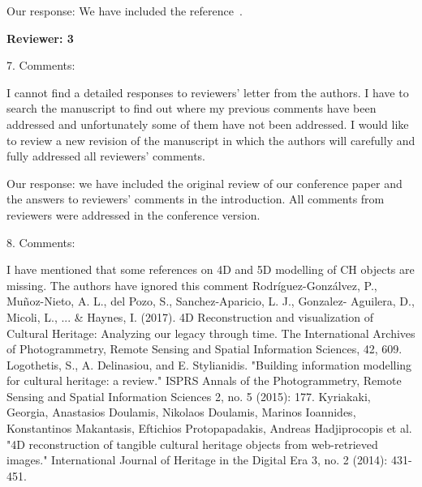 \documentclass[acmlarge,screen,dvipsnames]{acmart}
\begin{document}
Our response: We have included the reference~\cite{cgal:eb-14a}.

\greenEnd

\textbf{Reviewer: 3}


7. Comments:


I cannot find a detailed responses to reviewers' letter from the authors. I have to search the manuscript to find out where my previous comments have been addressed and unfortunately some of them have not been addressed. I would like to review a new revision of the manuscript in which the authors will carefully and fully addressed all reviewers' comments. 

\greenBegin

Our response: we have included the original review of our conference paper and the answers to reviewers’ comments  in the introduction. All comments from reviewers were addressed in the conference version.

\greenEnd


8. Comments:

I have mentioned that some references on 4D and 5D modelling of CH objects are missing. The authors have ignored this comment
Rodríguez-Gonzálvez, P., Muñoz-Nieto, A. L., del Pozo, S., Sanchez-Aparicio, L. J., Gonzalez- Aguilera, D., Micoli, L., ... \& Haynes, I. (2017). 4D Reconstruction and visualization of Cultural Heritage: Analyzing our legacy through time. The International Archives of Photogrammetry,
Remote Sensing and Spatial Information Sciences, 42, 609.
Logothetis, S., A. Delinasiou, and E. Stylianidis. "Building information modelling for cultural heritage: a review." ISPRS Annals of the Photogrammetry, Remote Sensing and Spatial Information Sciences 2, no. 5 (2015): 177.
Kyriakaki, Georgia, Anastasios Doulamis, Nikolaos Doulamis, Marinos Ioannides, Konstantinos Makantasis, Eftichios Protopapadakis, Andreas Hadjiprocopis et al. "4D reconstruction of tangible cultural heritage objects from web-retrieved images." International Journal of Heritage in the Digital Era 3, no. 2 (2014): 431-451.

\greenBegin
\end{document}

